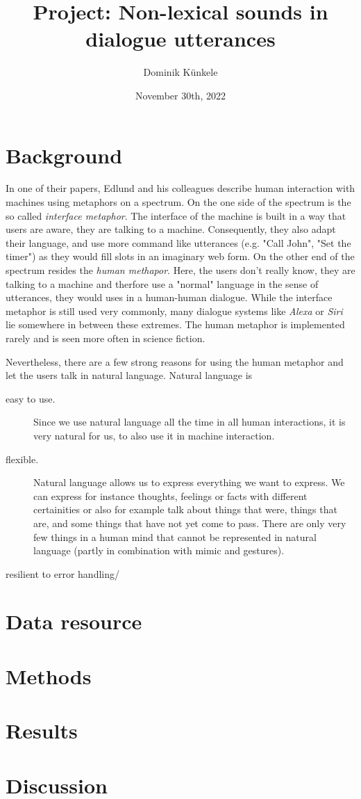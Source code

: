 \documentclass[
	11pt, %
]{fphw}
\title{Project: Non-lexical sounds in dialogue utterances} %
\date{November 30th, 2022} %
\author{Dominik Künkele}
\institute{University of Gothenburg} %
\begin{document}
\maketitle %


\section*{Background}
In one of their papers, Edlund and his colleagues describe human interaction with machines using metaphors on a spectrum. On the one side of the spectrum is the so called \emph{interface metaphor}. The interface of the machine is built in a way that users are aware, they are talking to a machine. Consequently, they also adapt their language, and use more command like utterances (e.g. "Call John", "Set the timer") as they would fill slots in an imaginary web form. On the other end of the spectrum resides the \emph{human methapor}. Here, the users don't really know, they are talking to a machine and therfore use a "normal" language in the sense of utterances, they would uses in a human-human dialogue. While the interface metaphor is still used very commonly, many dialogue systems like \emph{Alexa} or \emph{Siri} lie somewhere in between these extremes. The human metaphor is implemented rarely and is seen more often in science fiction. 

Nevertheless, there are a few strong reasons for using the human metaphor and let the users talk in natural language. Natural language is 
\begin{description}
    \item[easy to use.] Since we use natural language all the time in all human interactions, it is very natural for us, to also use it in machine interaction. 
    \item[flexible.] Natural language allows us to express everything we want to express. We can express for instance thoughts, feelings or facts with different certainities or also for example talk about things that were, things that are, and some things that have not yet come to pass. There are only very few things in a human mind that cannot be represented in natural language (partly in combination with mimic and gestures).  
    \item[resilient to error handling/] 
\end{description}

\section*{Data resource}

\section*{Methods}

\section*{Results}

\section*{Discussion}
\end{document}
